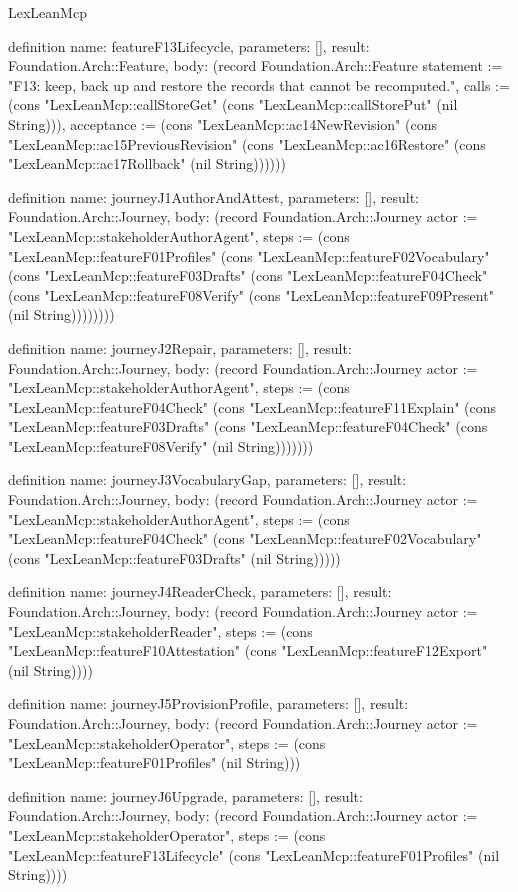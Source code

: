 \begin{lexlean}{LexLeanMcp}
\begin{semanticmodule}
definition{
  name: featureF13Lifecycle,
  parameters: [],
  result: Foundation.Arch::Feature,
  body: (record Foundation.Arch::Feature {statement := "F13: keep, back up and restore the records that cannot be recomputed.", calls := (cons "LexLeanMcp::callStoreGet" (cons "LexLeanMcp::callStorePut" (nil String))), acceptance := (cons "LexLeanMcp::ac14NewRevision" (cons "LexLeanMcp::ac15PreviousRevision" (cons "LexLeanMcp::ac16Restore" (cons "LexLeanMcp::ac17Rollback" (nil String)))))})
}

definition{
  name: journeyJ1AuthorAndAttest,
  parameters: [],
  result: Foundation.Arch::Journey,
  body: (record Foundation.Arch::Journey {actor := "LexLeanMcp::stakeholderAuthorAgent", steps := (cons "LexLeanMcp::featureF01Profiles" (cons "LexLeanMcp::featureF02Vocabulary" (cons "LexLeanMcp::featureF03Drafts" (cons "LexLeanMcp::featureF04Check" (cons "LexLeanMcp::featureF08Verify" (cons "LexLeanMcp::featureF09Present" (nil String)))))))})
}

definition{
  name: journeyJ2Repair,
  parameters: [],
  result: Foundation.Arch::Journey,
  body: (record Foundation.Arch::Journey {actor := "LexLeanMcp::stakeholderAuthorAgent", steps := (cons "LexLeanMcp::featureF04Check" (cons "LexLeanMcp::featureF11Explain" (cons "LexLeanMcp::featureF03Drafts" (cons "LexLeanMcp::featureF04Check" (cons "LexLeanMcp::featureF08Verify" (nil String))))))})
}

definition{
  name: journeyJ3VocabularyGap,
  parameters: [],
  result: Foundation.Arch::Journey,
  body: (record Foundation.Arch::Journey {actor := "LexLeanMcp::stakeholderAuthorAgent", steps := (cons "LexLeanMcp::featureF04Check" (cons "LexLeanMcp::featureF02Vocabulary" (cons "LexLeanMcp::featureF03Drafts" (nil String))))})
}

definition{
  name: journeyJ4ReaderCheck,
  parameters: [],
  result: Foundation.Arch::Journey,
  body: (record Foundation.Arch::Journey {actor := "LexLeanMcp::stakeholderReader", steps := (cons "LexLeanMcp::featureF10Attestation" (cons "LexLeanMcp::featureF12Export" (nil String)))})
}

definition{
  name: journeyJ5ProvisionProfile,
  parameters: [],
  result: Foundation.Arch::Journey,
  body: (record Foundation.Arch::Journey {actor := "LexLeanMcp::stakeholderOperator", steps := (cons "LexLeanMcp::featureF01Profiles" (nil String))})
}

definition{
  name: journeyJ6Upgrade,
  parameters: [],
  result: Foundation.Arch::Journey,
  body: (record Foundation.Arch::Journey {actor := "LexLeanMcp::stakeholderOperator", steps := (cons "LexLeanMcp::featureF13Lifecycle" (cons "LexLeanMcp::featureF01Profiles" (nil String)))})
}
\end{semanticmodule}
\end{lexlean}
